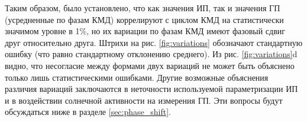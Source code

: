Таким образом, было установлено, что как значения ИП, так и значения ГП (усредненные по фазам КМД) коррелируют с циклом КМД на статистически значимом уровне в 1\%, но их вариации по фазам КМД имеют фазовый сдвиг друг относительно друга. Штрихи на рис. \ref{fig:variations} обозначают стандартную ошибку (что равно стандартному отклонению среднего). Из рис. \ref{fig:variations}{d} видно, что несогласие между формами двух вариаций не может быть объяснено только лишь статистическими ошибками. Другие возможные объяснения различия вариаций заключаются в неточности используемой параметризации ИП и в воздействии солнечной активности на измерения ГП. Эти вопросы будут обсуждаться ниже в разделе \ref{sec:phase_shift}.